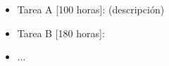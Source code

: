 \documentclass[12pt]{article}
\begin{document}
\bigskip

\begin{itemize}
    \item Tarea A [100 horas]: (descripción)
    \item Tarea B [180 horas]:
    \item ...
\end{itemize}

\bigskip




\end{document}
